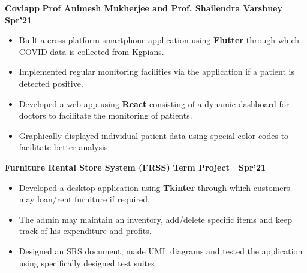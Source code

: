 \documentclass[10pt]{article}
\begin{document}
\vspace{-0.5ex}
\large {\textbf{Coviapp}} \normalsize  \href{https://github.com/coviapp} {\hspace{0.5ex}\faGithub} {\hfill} \textbf{Prof Animesh Mukherjee and Prof. Shailendra Varshney | Spr'21}\\[-1.75em]
\begin{itemize}
    \item Built a cross-platform smartphone application using \textbf{Flutter} through which COVID data is collected from Kgpians.\\[-1.9em]
    \item Implemented regular monitoring facilities via the application if a patient is detected positive. \\[-1.9em]
    \item Developed a web app using \textbf{React} consisting of a dynamic dashboard for doctors to facilitate the monitoring of patients.\\[-1.9em]
    \item Graphically displayed individual patient data using special color codes to facilitate better analysis.
\end{itemize}
\vspace{-0.5ex}
\large {\textbf{Furniture Rental Store System (FRSS)}} \normalsize  \href{https://github.com/Abhitipu/FRSS-Software-Lab} {\hspace{0.5ex}\faGithub} {\hfill} \textbf{Term Project | Spr'21}\\[-1.75em]
\begin{itemize}
    \item Developed a desktop application using \textbf{Tkinter} through which customers may loan/rent furniture if required.\\[-1.9em]
    \item The admin may maintain an inventory, add/delete specific items and keep track of his expenditure and profits. \\[-1.9em]
    \item Designed an SRS document, made UML diagrams and tested the application using specifically designed test suites\\[-1em]
\end{itemize}
\vspace{-0.5ex}
\end{document}
